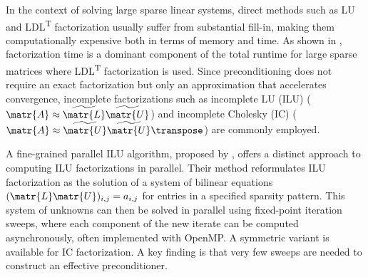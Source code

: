 In the context of solving large sparse linear systems, direct methods such as LU
and LDL\textsuperscript{T} factorization usually suffer from substantial
fill-in, making them computationally expensive both in terms of memory and time.
As shown in \cite{wong_exploring_2024}, factorization time is a dominant
component of the total runtime for large sparse matrices where
LDL\textsuperscript{T} factorization is used. Since preconditioning does not
require an exact factorization but only an approximation that accelerates
convergence, incomplete factorizations such as incomplete LU (ILU) (\(\matr{A}
\approx \widetilde{\matr{L}} \widetilde{\matr{U}}\)) and incomplete Cholesky
(IC) (\(\matr{A} \approx \widetilde{\matr{U}} \widetilde{\matr{U}}\transpose\))
are commonly employed.

A fine-grained parallel ILU algorithm, proposed by
\textcite{chow_fine-grained_2015}, offers a distinct approach to computing ILU
factorizations in parallel. Their method reformulates ILU factorization as the
solution of a system of bilinear equations \((\matr{L} \matr{U})_{i,j} =
a_{i,j}\) for entries in a specified sparsity pattern. This system of unknowns
can then be solved in parallel using fixed-point iteration sweeps, where each
component of the new iterate can be computed asynchronously, often implemented
with OpenMP. A symmetric variant is available for IC factorization. A key
finding is that very few sweeps are needed to construct an effective
preconditioner.

